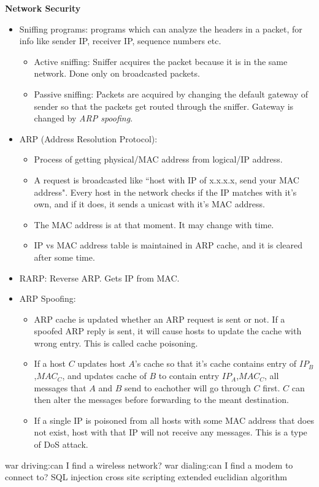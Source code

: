 \documentclass{article}
\begin{document}
\begin{center}
	\LARGE \textbf{Network Security}\\
	\vspace{20pt}
\end{center}
\large
\begin{itemize}
	\item Sniffing programs: programs which can analyze the headers in a packet, for info like sender IP, receiver IP, sequence numbers etc.
	\begin{itemize}
		\item Active sniffing: Sniffer acquires the packet because it is in the same network. Done only on broadcasted packets.
		\item Passive sniffing: Packets are acquired by changing the default gateway of sender so that the packets get routed through the sniffer. Gateway is changed by \textit{ARP spoofing}.
	\end{itemize}
	\item ARP (Address Resolution Protocol): \begin{itemize}
		\item Process of getting physical/MAC address from logical/IP address.
		\item A request is broadcasted like ``host with IP of x.x.x.x, send your MAC address". Every host in the network checks if the IP matches with it's own, and if it does, it sends a unicast with it's MAC address.
		\item The MAC address is at that moment. It may change with time.
		\item IP vs MAC address table is maintained in ARP cache, and it is cleared after some time.
	\end{itemize}
	\item RARP: Reverse ARP. Gets IP from MAC.
	\item ARP Spoofing:\begin{itemize}
		\item ARP cache is updated whether an ARP request is sent or not. If a spoofed ARP reply is sent, it will cause hosts to update the cache with wrong entry. This is called cache poisoning.
		\item If a host $C$ updates host $A$'s cache so that it's cache contains entry of $IP_B$,$MAC_C$, and updates cache of $B$ to contain entry $IP_A$,$MAC_C$, all messages that $A$ and $B$ send to eachother will go through $C$ first. $C$ can then alter the messages before forwarding to the meant destination.
		\item If a single IP is poisoned from all hosts with some MAC address that does not exist, host with that IP will not receive any messages. This is a type of DoS attack.
	\end{itemize}
\end{itemize}
war driving:can I find a wireless network?
war dialing:can I find a modem to connect to?
SQL injection
cross site scripting
extended euclidian algorithm
\end{document}
